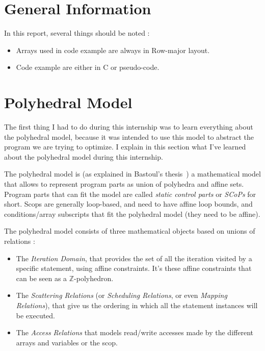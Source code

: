 \documentclass[paper=a4, fontsize=11.5pt]{scrartcl}
\numberwithin{equation}{section}        %
\numberwithin{figure}{section}          %
\numberwithin{table}{section}               %
\begin{document}
\section{General Information}

    In this report, several things should be noted :
    \begin{itemize}
        \item Arrays used in code example are always in Row-major layout.
        \item Code example are either in C or pseudo-code.
    \end{itemize}

\section{Polyhedral Model}
The first thing I had to do during this internship was to learn everything about the polyhedral
model, because it was intended to use this model to abstract the program we are trying
to optimize. I explain in this section what I've learned about the polyhedral model during
this internship.

\bigskip

The polyhedral model is (as explained in Bastoul's thesis~\cite{Bas'12}) a mathematical
model that allows to represent program parts as union of polyhedra and affine sets.
Program parts that can fit the model are called \textit{static control parts} or
\textit{SCoPs} for short. Scops are generally loop-based, and need to have affine loop bounds,
and conditions/array subscripts that fit the polyhedral model (they need to be affine).

The polyhedral model consists of three mathematical objects based on unions of relations :
\begin{itemize}
    \item The \textit{Iteration Domain}, that provides the set of all the iteration visited
        by a specific statement, using affine constraints. It's these affine constraints 
        that can be seen as a $\mathbb{Z}$-polyhedron.
    \item The \textit{Scattering Relations} (or \textit{Scheduling Relations},
        or even \textit{Mapping Relations}), that give us the ordering in which
        all the statement instances will be executed.
    \item The \textit{Access Relations} that models read/write accesses made by
        the different arrays and variables or the scop.
\end{itemize}
\end{document}
